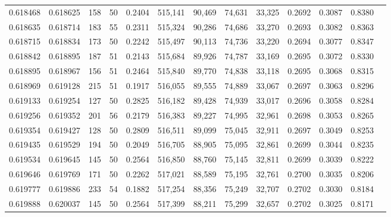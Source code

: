 \begin{tabular}{rrrrrrrrrrrrr}
0.618468 & 0.618625 &   158 &  50 &                                     0.2404 & 515,141 &  90,469 &  74,631 &  33,325 & 0.2692 & 0.3087 & 0.8380 \\
0.618635 & 0.618714 &   183 &  55 &                                     0.2311 & 515,324 &  90,286 &  74,686 &  33,270 & 0.2693 & 0.3082 & 0.8363 \\
0.618715 & 0.618834 &   173 &  50 &                                     0.2242 & 515,497 &  90,113 &  74,736 &  33,220 & 0.2694 & 0.3077 & 0.8347 \\
0.618842 & 0.618895 &   187 &  51 &                                     0.2143 & 515,684 &  89,926 &  74,787 &  33,169 & 0.2695 & 0.3072 & 0.8330 \\
0.618895 & 0.618967 &   156 &  51 &                                     0.2464 & 515,840 &  89,770 &  74,838 &  33,118 & 0.2695 & 0.3068 & 0.8315 \\
0.618969 & 0.619128 &   215 &  51 &                                     0.1917 & 516,055 &  89,555 &  74,889 &  33,067 & 0.2697 & 0.3063 & 0.8296 \\
0.619133 & 0.619254 &   127 &  50 &                                     0.2825 & 516,182 &  89,428 &  74,939 &  33,017 & 0.2696 & 0.3058 & 0.8284 \\
0.619256 & 0.619352 &   201 &  56 &                                     0.2179 & 516,383 &  89,227 &  74,995 &  32,961 & 0.2698 & 0.3053 & 0.8265 \\
0.619354 & 0.619427 &   128 &  50 &                                     0.2809 & 516,511 &  89,099 &  75,045 &  32,911 & 0.2697 & 0.3049 & 0.8253 \\
0.619435 & 0.619529 &   194 &  50 &                                     0.2049 & 516,705 &  88,905 &  75,095 &  32,861 & 0.2699 & 0.3044 & 0.8235 \\
0.619534 & 0.619645 &   145 &  50 &                                     0.2564 & 516,850 &  88,760 &  75,145 &  32,811 & 0.2699 & 0.3039 & 0.8222 \\
0.619646 & 0.619769 &   171 &  50 &                                     0.2262 & 517,021 &  88,589 &  75,195 &  32,761 & 0.2700 & 0.3035 & 0.8206 \\
0.619777 & 0.619886 &   233 &  54 &                                     0.1882 & 517,254 &  88,356 &  75,249 &  32,707 & 0.2702 & 0.3030 & 0.8184 \\
0.619888 & 0.620037 &   145 &  50 &                                     0.2564 & 517,399 &  88,211 &  75,299 &  32,657 & 0.2702 & 0.3025 & 0.8171 \\

\end{tabular}
